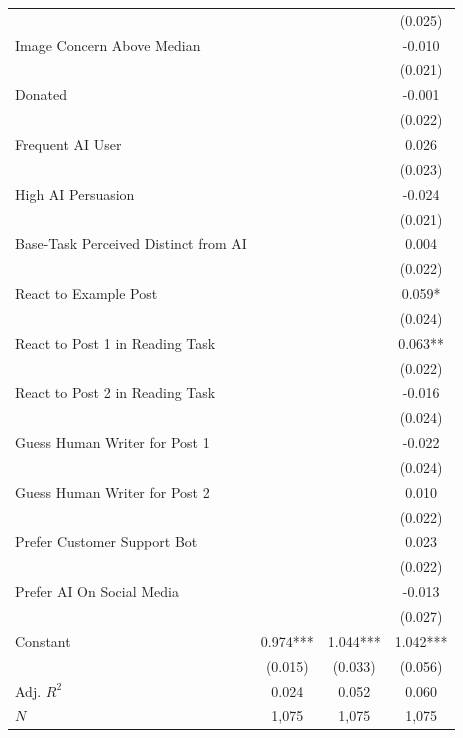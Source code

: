 \begin{tabular*}{\hsize}{@{\hskip\tabcolsep\extracolsep\fill}l*{3}{c}}
                &            &            &  (0.025)   \\
\addlinespace
Image Concern Above Median&            &            &   -0.010   \\
                &            &            &  (0.021)   \\
\addlinespace
Donated         &            &            &   -0.001   \\
                &            &            &  (0.022)   \\
\addlinespace
Frequent AI User&            &            &    0.026   \\
                &            &            &  (0.023)   \\
\addlinespace
High AI Persuasion&            &            &   -0.024   \\
                &            &            &  (0.021)   \\
\addlinespace
Base-Task Perceived Distinct from AI&            &            &    0.004   \\
                &            &            &  (0.022)   \\
\addlinespace
React to Example Post&            &            &    0.059*  \\
                &            &            &  (0.024)   \\
\addlinespace
React to Post 1 in Reading Task&            &            &    0.063** \\
                &            &            &  (0.022)   \\
\addlinespace
React to Post 2 in Reading Task&            &            &   -0.016   \\
                &            &            &  (0.024)   \\
\addlinespace
Guess Human Writer for Post 1&            &            &   -0.022   \\
                &            &            &  (0.024)   \\
\addlinespace
Guess Human Writer for Post 2&            &            &    0.010   \\
                &            &            &  (0.022)   \\
\addlinespace
Prefer Customer Support Bot&            &            &    0.023   \\
                &            &            &  (0.022)   \\
\addlinespace
Prefer AI On Social Media&            &            &   -0.013   \\
                &            &            &  (0.027)   \\
\addlinespace
Constant        &    0.974***&    1.044***&    1.042***\\
                &  (0.015)   &  (0.033)   &  (0.056)   \\
\midrule
Adj. \(R^2\)    &    0.024   &    0.052   &    0.060   \\
\(N\)           &    1,075   &    1,075   &    1,075   \\
\bottomrule
\end{tabular*}
